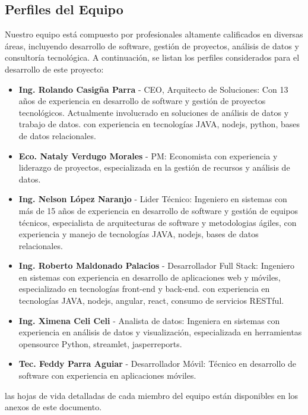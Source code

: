 \subsection{Perfiles del Equipo}
Nuestro equipo está compuesto por profesionales altamente calificados en diversas áreas, incluyendo desarrollo de software, gestión de proyectos, análisis de datos y consultoría tecnológica. A continuación, se listan los perfiles considerados para el desarrollo de este proyecto:
\begin{itemize}
        \item \textbf{Ing. Rolando Casigña Parra} - CEO, Arquitecto de Soluciones: Con 13 años de experiencia en desarrollo de software y gestión de proyectos tecnológicos. Actualmente involucrado en soluciones de análisis de datos y trabajo de datos. con experiencia en tecnologías JAVA, nodejs, python, bases de datos relacionales.
        \item \textbf{Eco. Nataly Verdugo Morales} - PM: Economista con experiencia y liderazgo de proyectos, especializada en la gestión de recursos y análisis de datos.
        \item \textbf{Ing. Nelson López Naranjo} - Lider Técnico: Ingeniero en sistemas con más de 15 años de experiencia en desarrollo de software y gestión de equipos técnicos, especialista de arquitecturas de software y metodologias ágiles, con experiencia y manejo de tecnologías JAVA, nodejs, bases de datos relacionales.
        \item \textbf{Ing. Roberto Maldonado Palacios} - Desarrollador Full Stack: Ingeniero en sistemas con experiencia en desarrollo de aplicaciones web y móviles, especializado en tecnologías front-end y back-end. con experiencia en tecnologías JAVA, nodejs, angular, react, consumo de servicios RESTful.
        \item \textbf{Ing. Ximena Celi Celi} - Analista de datos: Ingeniera en sistemas con experiencia en análisis de datos y visualización, especializada en herramientas opensource Python, streamlet, jasperreports.
        \item  \textbf{Tec. Feddy Parra Aguiar} - Desarrollador Móvil: Técnico en desarrollo de software con experiencia en aplicaciones móviles.
\end{itemize}
las hojas de vida detalladas de cada miembro del equipo están disponibles en los anexos de este documento.